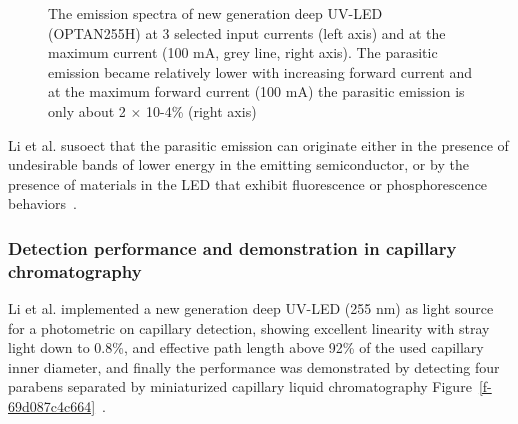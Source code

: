 \documentclass[11pt]{article}
\makeatletter
\def\fixFloatSize#1{}%
\makeatother
\begin{document}
\bgroup
\fixFloatSize{images/35099b97-39f6-4470-8f92-209c7f283a99-uemissionspectraofnewgenerationoptan255h.png}
\begin{figure}[!htbp]
\centering \makeatletter{}
\makeatother 
\caption{{The emission spectra of new generation deep UV-LED (OPTAN255H) at 3 selected input currents (left axis) and at the maximum current (100 mA, grey line, right axis). The parasitic emission became relatively lower with increasing forward current and at the maximum forward current (100 mA) the parasitic emission is only about 2 \ensuremath{\times} 10-4\% (right axis) \unskip~\protect\cite{693772:16459460}}}
\label{f-23bca4aac565}
\end{figure}
\egroup
Li et al. susoect that the parasitic emission can originate either in the presence of undesirable bands of lower energy in the emitting semiconductor, or by the presence of materials in the LED that exhibit fluorescence or phosphorescence behaviors\unskip~\cite{693772:16459460}.



\subsubsection{Detection performance and demonstration in capillary chromatography}Li et al. implemented a new generation deep UV-LED (255 nm) as light source for a photometric on capillary detection, showing excellent linearity with stray light down to 0.8\%, and effective path length above 92\% of the used capillary inner diameter, and finally the performance was demonstrated by detecting four parabens separated by miniaturized capillary liquid chromatography Figure~\ref{f-69d087c4c664}\unskip~\cite{693772:16459460}.
\end{document}
